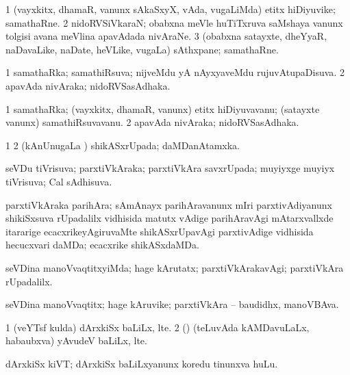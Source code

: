 {{{{{{\bentry
{} 
\gl{\nA}
\expl{}
\bmng
\bnum
\num{1} (vayxkitx, dhamaR, \mo vanunx sAkaSxyX, vAda, \mo vugaLiMda) etitx hiDiyuvike; samathaRne. 
\num{2} nidoRVSiVkaraN; obabxna meVle huTiTxruva saMshaya \mo vanunx tolgisi avana meVlina apavAdada nivAraNe. 
\num{3} (obabxna satayxte, dheYyaR, naDavaLike, naDate, heVLike, \mo vugaLa) sAthxpane; samathaRne. 
\enum
\emng
\eentry

\bentry
{} 
\gl{\gu}
\expl{}
\bmng
\bnum
\num{1} samathaRka; samathiRsuva; nijveMdu yA nAyxyaveMdu rujuvAtupaDisuva. 
\num{2} apavAda nivAraka; nidoRVSasAdhaka. 
\enum
\emng
\eentry

\bentry
{} 
\gl{\nA}
\expl{}
\bmng
\bnum
\num{1} samathaRka; (vayxkitx, dhamaR, \mo vanunx) etitx hiDiyuvavanu; (satayxte \mo vanunx) samathiRsuvavanu. 
\num{2} apavAda nivAraka; nidoRVSasAdhaka. 
\enum
\emng
\eentry

\bentry
{} 
\gl{\gu}
\expl{}
\bmng
\bnum
\num{1} 
\num{2} (kAnUnugaLa \vi) shikASxrUpada; daMDanAtamxka. 
\enum
\emng
\eentry

\bentry
{} 
\gl{\gu}
\expl{}
\bmng
 seVDu tiVrisuva; parxtiVkAraka; parxtiVkAra savxrUpada; muyiyxge muyiyx tiVrisuva; Cal sAdhisuva. 
\emng
\eentry

\bentry
{}
\gl{\nA}
\expl{}
\bmng
 parxtiVkAraka parihAra; sAmAnayx parihAravanunx mIri parxtivAdiyanunx shikiSxsuva rUpadalilx vidhisida matutx vAdige parihAravAgi mAtarxvallxde itararige ecacxrikeyAgiruvaMte shikASxrUpavAgi parxtivAdige vidhisida hecucxvari daMDa; ecacxrike shikASxdaMDa. 
\emng
\eentry

\bentry
{} 
\gl{\kirxvi}
\expl{}
\bmng
 seVDina manoVvaqtitxyiMda; hage kArutatx; parxtiVkArakavAgi; parxtiVkAra rUpadalilx. 
\emng
\eentry

\bentry
{} 
\gl{\nA}
\expl{}
\bmng
 seVDina manoVvaqtitx; hage kAruvike; parxtiVkAra -- baudidhx, manoVBAva. 
\emng
\eentry

\bentry
{} 
\gl{\nA}
\expl{}
\bmng
\bnum
\num{1} (veYTsf kulda) dArxkiSx baLiLx, lte. 
\num{2} (\ame) (teLuvAda kAMDavuLaLx, habaubxva) yAvudeV baLiLx, lte. 
\enum
\emng
\eentry

\bentry
{} 
\gl{\nA}
\expl{}
\bmng
 dArxkiSx kiVT; dArxkiSx baLiLxyanunx koredu tinunxva huLu. 
\emng
\eentry

}}}}}}
